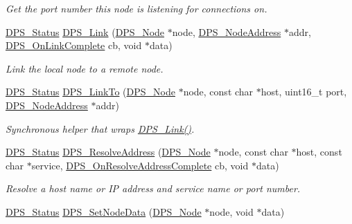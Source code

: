 \begin{DoxyCompactItemize}
\begin{DoxyCompactList}\small\item\em Get the port number this node is listening for connections on. \end{DoxyCompactList}\item 
\hyperlink{group__status_ga30395a84d3cad9d4ec29848106415038}{D\+P\+S\+\_\+\+Status} \hyperlink{group__node_ga5064c63b8ce76bf34402e0c80183234b}{D\+P\+S\+\_\+\+Link} (\hyperlink{group__node_ga4dd612ab965134321bb57fdb065f121c}{D\+P\+S\+\_\+\+Node} $\ast$node, \hyperlink{group__nodeaddress_ga9e9f56aa38e82b4edcef7eb81e9f5bd2}{D\+P\+S\+\_\+\+Node\+Address} $\ast$addr, \hyperlink{group__node_gaaf70ac42acab8a67693947871e97600f}{D\+P\+S\+\_\+\+On\+Link\+Complete} cb, void $\ast$data)
\begin{DoxyCompactList}\small\item\em Link the local node to a remote node. \end{DoxyCompactList}\item 
\hyperlink{group__status_ga30395a84d3cad9d4ec29848106415038}{D\+P\+S\+\_\+\+Status} \hyperlink{group__node_ga0bd13b2bd395bbc7807ecc899a8862f1}{D\+P\+S\+\_\+\+Link\+To} (\hyperlink{group__node_ga4dd612ab965134321bb57fdb065f121c}{D\+P\+S\+\_\+\+Node} $\ast$node, const char $\ast$host, uint16\+\_\+t port, \hyperlink{group__nodeaddress_ga9e9f56aa38e82b4edcef7eb81e9f5bd2}{D\+P\+S\+\_\+\+Node\+Address} $\ast$addr)
\begin{DoxyCompactList}\small\item\em Synchronous helper that wraps \hyperlink{group__node_ga5064c63b8ce76bf34402e0c80183234b}{D\+P\+S\+\_\+\+Link()}. \end{DoxyCompactList}\item 
\hyperlink{group__status_ga30395a84d3cad9d4ec29848106415038}{D\+P\+S\+\_\+\+Status} \hyperlink{group__node_gab78df7f4498b847ddb32fdd33d39ef0f}{D\+P\+S\+\_\+\+Resolve\+Address} (\hyperlink{group__node_ga4dd612ab965134321bb57fdb065f121c}{D\+P\+S\+\_\+\+Node} $\ast$node, const char $\ast$host, const char $\ast$service, \hyperlink{group__node_gac1c96ed1ff9a92e7421ae1c428acb904}{D\+P\+S\+\_\+\+On\+Resolve\+Address\+Complete} cb, void $\ast$data)
\begin{DoxyCompactList}\small\item\em Resolve a host name or IP address and service name or port number. \end{DoxyCompactList}\item 
\hyperlink{group__status_ga30395a84d3cad9d4ec29848106415038}{D\+P\+S\+\_\+\+Status} \hyperlink{group__node_gad19cf4272ba11e935654175c83db2ce1}{D\+P\+S\+\_\+\+Set\+Node\+Data} (\hyperlink{group__node_ga4dd612ab965134321bb57fdb065f121c}{D\+P\+S\+\_\+\+Node} $\ast$node, void $\ast$data)

\end{DoxyCompactItemize}
